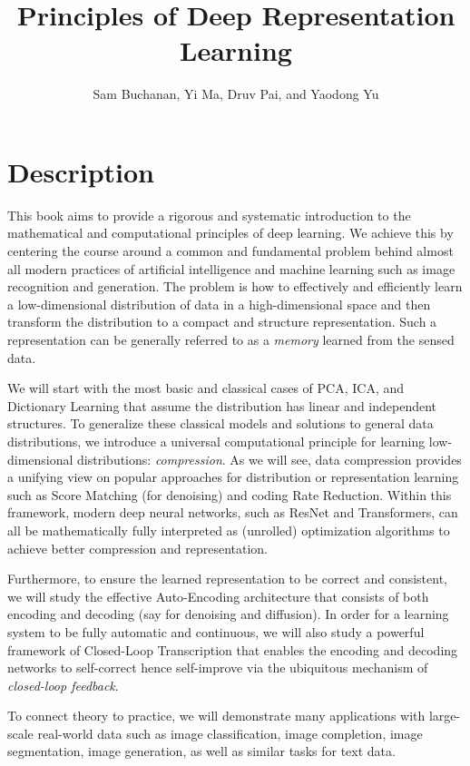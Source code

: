 \documentclass{article}
\title{Principles of Deep Representation Learning}
\author{Sam Buchanan, Yi Ma,  Druv Pai, and Yaodong Yu }
\date{}
\begin{document}
\maketitle


\section*{Description}

This book aims to provide a rigorous and systematic introduction to the mathematical and computational principles of deep learning. We achieve this by centering the course around a common and fundamental problem behind almost all modern practices of artificial intelligence and machine learning such as image recognition and generation. The problem is how to effectively and efficiently learn a low-dimensional distribution of data in a high-dimensional space and then transform the distribution to a compact and structure representation. Such a representation can be generally referred to as a {\em memory} learned from the sensed data. 

We will start with the most basic and classical cases of PCA, ICA, and Dictionary Learning that assume the distribution has linear and independent structures. To generalize these classical models and solutions to general data distributions, we introduce a universal computational principle for learning low-dimensional distributions: {\em compression}. As we will see, data compression provides a unifying view on popular approaches for distribution or representation learning such as Score Matching (for denoising) and coding Rate Reduction. Within this framework, modern deep neural networks, such as ResNet and Transformers, can all be mathematically fully interpreted as (unrolled) optimization algorithms to achieve better compression and representation. 

Furthermore, to ensure the learned representation to be correct and consistent, we will study the effective Auto-Encoding architecture that consists of both encoding and decoding (say for denoising and diffusion). In order for a learning system to be fully automatic and continuous, we will also study a powerful framework of Closed-Loop Transcription that enables the encoding and decoding networks to self-correct hence self-improve via the ubiquitous mechanism of {\em closed-loop feedback}. 

To connect theory to practice, we will demonstrate many applications with large-scale real-world data such as image classification, image completion, image segmentation, image generation, as well as similar tasks for text data. 
\end{document}
